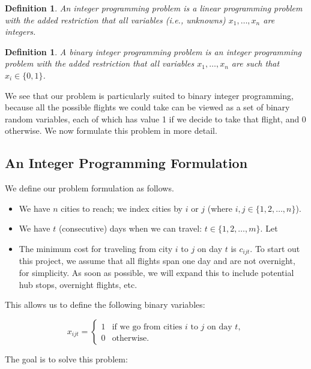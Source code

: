 \documentclass{article}
\newtheorem{defi}[thm]{Definition}
\begin{document}
\begin{defi}\label{defi:integer_programming}
An \emph{integer programming problem} is a linear programming problem with the added restriction that all variables (i.e., unknowns) $x_1, \ldots,
x_n$ are integers.
\end{defi}

\begin{defi}\label{defi:binary_programming}
A \emph{binary integer programming problem} is an integer programming problem with the added restriction that all variables $x_1, \ldots,
x_n$ are such that $x_i \in \{0,1\}$.
\end{defi}

We see that our problem is particularly suited to binary integer programming, because all the possible flights we could take can be viewed as a set of
binary random variables, each of which has value 1 if we decide to take that flight, and 0 otherwise. We now formulate this problem in more detail.

\subsection{An Integer Programming Formulation}

We define our problem formulation as follows.

\begin{itemize}
    \item We have $n$ cities to reach; we index cities by $i$ or $j$ (where $i, j \in \{1, 2, \ldots, n\}$).
    \item We have $t$ (consecutive) days when we can travel: $t \in \{1, 2, \ldots, m\}$. Let
    \item The minimum cost for traveling from city $i$ to $j$ on day $t$ is $c_{ijt}$. To start out this project, we assume that all flights span one
day and are not overnight, for simplicity. As soon as possible, we will expand this to include potential hub stops, overnight flights, etc.
\end{itemize}

This allows us to define the following binary variables:

\[
x_{ijt} = \begin{cases}
1 &\mbox{if we go from cities } i \mbox{ to } j \mbox{ on day } t, \\ 
0 & \mbox{otherwise}.
\end{cases}
\]

The goal is to solve this problem:
\end{document}
